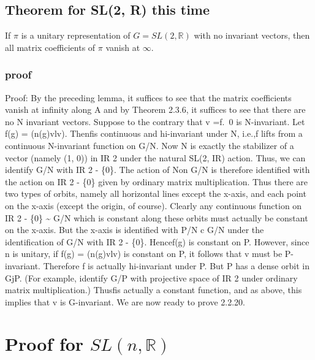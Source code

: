 \documentclass[
]{article}
\begin{document}
\hypertarget{theorem-for-sl2-r-this-time}{%
\subsection{Theorem for SL(2, R) this
time}\label{theorem-for-sl2-r-this-time}}

If \(\pi\) is a unitary representation of \(G = SL(2, \mathbb{R})\) with
no invariant vectors, then all matrix coefficients of \(\pi\) vanish at
\(\infty\).

\hypertarget{proof-2}{%
\subsubsection{proof}\label{proof-2}}

 
Proof: By
the preceding lemma, it suffices to see that the matrix coefficients
vanish at infinity along A and by Theorem 2.3.6, it suffices to see that
there are no N invariant vectors. Suppose to the contrary that v =f.~0
is N-invariant. Let f(g) = (n(g)vlv). Thenfis continuous and
hi-invariant under N, i.e.,f lifts from a continuous N-invariant
function on G/N. Now N is exactly the stabilizer of a vector (namely (1,
0)) in IR 2 under the natural SL(2, IR) action. Thus, we can identify
G/N with IR 2 - \{0\}. The action of Non G/N is therefore identified
with the action on IR 2 - \{0\} given by ordinary matrix multiplication.
Thus there are two types of orbits, namely all horizontal lines except
the x-axis, and each point on the x-axis (except the origin, of course).
Clearly any continuous function on IR 2 - \{0\} \textasciitilde{} G/N
which is constant along these orbits must actually be constant on the
x-axis. But the x-axis is identified with P/N c G/N under the
identification of G/N with IR 2 - \{0\}. Hencef(g) is constant on P.
However, since n is unitary, if f(g) = (n(g)vlv) is constant on P, it
follows that v must be P-invariant. Therefore f is actually hi-invariant
under P. But P has a dense orbit in GjP. (For example, identify G/P with
projective space of IR 2 under ordinary matrix multiplication.) Thusfis
actually a constant function, and as above, this implies that v is
G-invariant. We are now ready to prove 2.2.20.



\hypertarget{proof-for-slnr}{%
  \section{Proof for \texorpdfstring{$SL(n, \mathbb{R})$}{SL(n, R)}}
\label{proof-for-slnr}}
\end{document}
